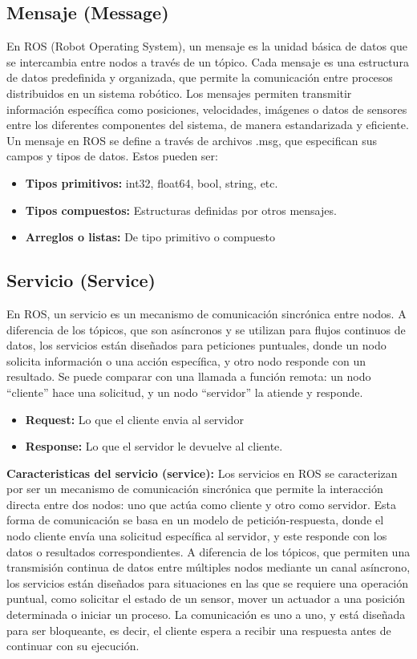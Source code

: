 \subsection{Mensaje (Message)}
En ROS (Robot Operating System), un mensaje es la unidad básica de datos que se intercambia entre nodos a través de un tópico. Cada mensaje es una estructura de datos predefinida y organizada, que permite la comunicación entre procesos distribuidos en un sistema robótico.
Los mensajes permiten transmitir información específica como posiciones, velocidades, imágenes o datos de sensores entre los diferentes componentes del sistema, de manera estandarizada y eficiente.
Un mensaje en ROS se define a través de archivos .msg, que especifican sus campos y tipos de datos. Estos pueden ser:
\begin{itemize}
    \item \textbf{Tipos primitivos:} int32, float64, bool, string, etc.
    \item \textbf{Tipos compuestos:} Estructuras definidas por otros mensajes.
    \item \textbf{Arreglos o listas:} De tipo primitivo o compuesto
\end{itemize}

\subsection{Servicio (Service)}
En ROS, un servicio es un mecanismo de comunicación sincrónica entre nodos. A diferencia de los tópicos, que son asíncronos y se utilizan para flujos continuos de datos, los servicios están diseñados para peticiones puntuales, donde un nodo solicita información o una acción específica, y otro nodo responde con un resultado.
Se puede comparar con una llamada a función remota: un nodo “cliente” hace una solicitud, y un nodo “servidor” la atiende y responde.
\begin{itemize}
    \item \textbf{Request:} Lo que el cliente envia al servidor
    \item \textbf{Response:} Lo que el servidor le devuelve al cliente.
\end{itemize}
\item \textbf{Caracteristicas del servicio (service):}
 Los servicios en ROS se caracterizan por ser un mecanismo de comunicación sincrónica que permite la interacción directa entre dos nodos: uno que actúa como cliente y otro como servidor. Esta forma de comunicación se basa en un modelo de petición-respuesta, donde el nodo cliente envía una solicitud específica al servidor, y este responde con los datos o resultados correspondientes.
A diferencia de los tópicos, que permiten una transmisión continua de datos entre múltiples nodos mediante un canal asíncrono, los servicios están diseñados para situaciones en las que se requiere una operación puntual, como solicitar el estado de un sensor, mover un actuador a una posición determinada o iniciar un proceso. La comunicación es uno a uno, y está diseñada para ser bloqueante, es decir, el cliente espera a recibir una respuesta antes de continuar con su ejecución.
